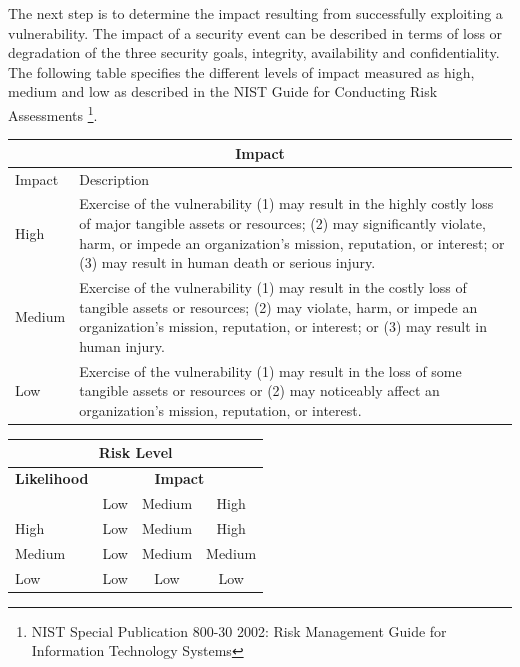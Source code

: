 \documentclass[a4paper, toc=index, 12pt, DIV14, twoside, BCOR2cm, headsepline, numbers=noenddot, bibliography=totoc]{report}
\begin{document}
\vspace{5mm}

The next step is to determine the impact resulting from successfully exploiting a vulnerability. The impact of a security event can be described in terms of loss or degradation of the three security goals, integrity, availability and confidentiality. The following table specifies the different levels of impact measured as high, medium and low as described in the NIST Guide for Conducting Risk Assessments \footnote{NIST Special Publication 800-30 2002: Risk Management Guide for Information Technology Systems}.
\begin{center}
\begin{tabular}{|l|p{10cm}|}
\hline
\multicolumn{2}{|c|}{\bf Impact} \\
\hline
Impact & Description \\
\hline
\hline
High   & \hspace*{20pt}
Exercise of the vulnerability (1) may result in the highly costly loss of major tangible assets or resources; (2) may significantly violate, harm, or impede an organization's mission, reputation, or interest; or (3) may result in human death or serious injury. \\
\hline
Medium & \hspace*{20pt}
Exercise of the vulnerability (1) may result in the costly loss of tangible assets or resources; (2) may violate, harm, or impede an organization's mission, reputation, or interest; or (3) may result in human injury. \\
\hline
Low   & \hspace*{20pt}
Exercise of the vulnerability (1) may result in the loss of some tangible assets or resources or (2) may noticeably affect an organization's mission, reputation, or interest. \\
\hline
\end{tabular}
\end{center}
%
\vspace{5mm}
%

\begin{center}
\begin{tabular}{|l|c|c|c|}
\hline
\multicolumn{4}{|c|}{{\bf Risk Level}} \\
\hline
{{\bf Likelihood}} & \multicolumn{3}{c|}{{\bf Impact}} \\ %
     & Low & Medium & High \\  \hline
 High & Low & Medium & High  \\
\hline
 Medium & Low & Medium & Medium \\
\hline
 Low & Low & Low & Low \\
\hline
\end{tabular}
\end{center}
\end{document}
